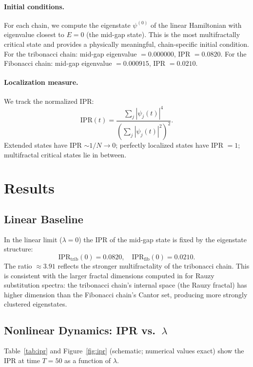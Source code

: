 \documentclass[12pt,a4paper]{article}
\begin{document}
\paragraph{Initial conditions.} For each chain, we compute the eigenstate
$\psi^{(0)}$ of the linear Hamiltonian with eigenvalue closest to $E = 0$
(the mid-gap state). This is the most multifractally critical state and
provides a physically meaningful, chain-specific initial condition.
For the tribonacci chain: mid-gap eigenvalue $= 0.000000$, IPR $= 0.0820$.
For the Fibonacci chain: mid-gap eigenvalue $= 0.000915$, IPR $= 0.0210$.

\paragraph{Localization measure.} We track the normalized IPR:
\[
  \mathrm{IPR}(t) = \frac{\sum_j |\psi_j(t)|^4}{\left(\sum_j |\psi_j(t)|^2\right)^2}.
\]
Extended states have IPR $\sim 1/N \to 0$; perfectly localized states have
IPR $= 1$; multifractal critical states lie in between.

\section{Results}

\subsection{Linear Baseline}

In the linear limit ($\lambda = 0$) the IPR of the mid-gap state is fixed by
the eigenstate structure:
\[
  \mathrm{IPR}_{\mathrm{trib}}(0) = 0.0820, \quad
  \mathrm{IPR}_{\mathrm{fib}}(0) = 0.0210.
\]
The ratio $\approx 3.91$ reflects the stronger multifractality of the
tribonacci chain. This is consistent with the larger fractal dimensions
computed in \cite{Krebbekx2023} for Rauzy substitution spectra: the tribonacci
chain's internal space (the Rauzy fractal) has higher dimension than the
Fibonacci chain's Cantor set, producing more strongly clustered eigenstates.

\subsection{Nonlinear Dynamics: IPR vs.\ $\lambda$}

Table~\ref{tab:ipr} and Figure~\ref{fig:ipr} (schematic; numerical values
exact) show the IPR at time $T = 50$ as a function of $\lambda$.
\end{document}
